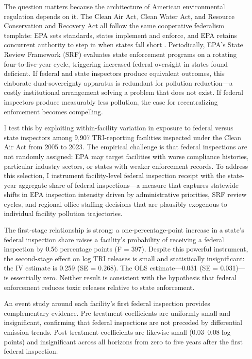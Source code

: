 \documentclass[12pt]{article}
\begin{document}
The question matters because the architecture of American environmental regulation depends on it. The Clean Air Act, Clean Water Act, and Resource Conservation and Recovery Act all follow the same cooperative federalism template: EPA sets standards, states implement and enforce, and EPA retains concurrent authority to step in when states fall short \citep{engel2006harnessing, sigman2014decentralization}. Periodically, EPA's State Review Framework (SRF) evaluates state enforcement programs on a rotating four-to-five-year cycle, triggering increased federal oversight in states found deficient. If federal and state inspectors produce equivalent outcomes, this elaborate dual-sovereignty apparatus is redundant for pollution reduction---a costly institutional arrangement solving a problem that does not exist. If federal inspectors produce measurably less pollution, the case for recentralizing enforcement becomes compelling.

I test this by exploiting within-facility variation in exposure to federal versus state inspectors among 9,907 TRI-reporting facilities inspected under the Clean Air Act from 2005 to 2023. The empirical challenge is that federal inspections are not randomly assigned: EPA may target facilities with worse compliance histories, particular industry sectors, or states with weaker enforcement records. To address this selection, I instrument facility-level federal inspection receipt with the state-year aggregate share of federal inspections---a measure that captures statewide shifts in EPA inspection intensity driven by administrative priorities, SRF review cycles, and regional office staffing decisions that are plausibly exogenous to individual facility pollution trajectories.

The first-stage relationship is strong: a one-percentage-point increase in a state's federal inspection share raises a facility's probability of receiving a federal inspection by 0.56 percentage points (F = 397). Despite this powerful instrument, the second-stage effect on log TRI releases is small and statistically insignificant: the IV estimate is 0.259 (SE = 0.268). The OLS estimate---0.031 (SE = 0.031)---is essentially zero. Neither result is consistent with the hypothesis that federal enforcement reduces toxic releases relative to state enforcement.

An event study around each facility's first federal inspection provides complementary evidence. Pre-treatment coefficients are uniformly small and insignificant, confirming that federal inspections are not preceded by differential emission trends. Post-treatment coefficients are likewise small (0.03--0.08 log points) and insignificant across all horizons from zero to five years after the first federal inspection.
\end{document}
